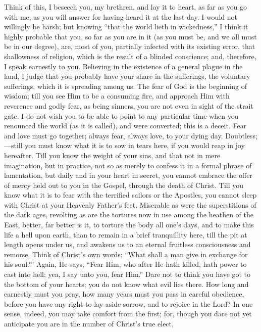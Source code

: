 Think of this, I beseech you, my brethren, and lay it
to heart, as far as you go with me, as you will answer
for having heard it at the last day. I would not
willingly be harsh; but knowing ``that the world
lieth in wickedness,'' I think it highly probable
that you, so far as you are in it (as you must be, and we
all must be in our degree), are, most of you, partially
infected with its existing error, that shallowness of
religion, which is the result of a blinded conscience;
and, therefore, I speak earnestly to you. Believing in
the existence of a general plague in the land, I judge
that you probably have your share in the sufferings, the
voluntary sufferings, which it is spreading among us. The
fear of God is the beginning of wisdom; till you see Him
to be a consuming fire, and approach Him with reverence
and godly fear, as being sinners, you are not even in
sight of the strait gate. I do not wish you to be able to
point to any particular time when you renounced the world
(as it is called), and were converted; this is a deceit.
Fear and love must go together; always fear, always love,
to your dying day. Doubtless;—still you must know
what it is to sow in tears here, if you would reap in joy
hereafter. Till you know the weight of your sins, and
that not in mere imagination, but in practice, not so as
merely to confess it in a formal phrase of lamentation,
but daily and in your heart in secret, you cannot embrace the offer of mercy held out to you in the Gospel, through
the death of Christ. Till you know what it is to fear
with the terrified sailors or the Apostles, you cannot
sleep with Christ at your Heavenly Father's feet.
Miserable as were the superstitions of the dark ages,
revolting as are the tortures now in use among the
heathen of the East, better, far better is it, to torture
the body all one's days, and to make this life a hell
upon earth, than to remain in a brief tranquillity here,
till the pit at length opens under us, and awakens us to
an eternal fruitless consciousness and remorse. Think of
Christ's own words: ``What shall a man give in
exchange for his soul?'' Again, He says, ``Fear
Him, who after He hath killed, hath power to cast into
hell; yea, I say unto you, fear Him.'' Dare not to
think you have got to the bottom of your hearts; you do
not know what evil lies there. How long and earnestly
must you pray, how many years must you pass in careful
obedience, before you have any right to lay aside sorrow,
and to rejoice in the Lord? In one sense, indeed, you may
take comfort from the first; for, though you dare not yet
anticipate you are in the number of Christ's true elect,
